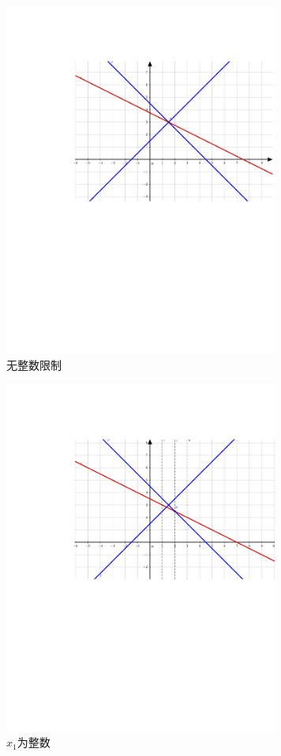 \documentclass[UTF8]{ctexart}
\begin{document}
\begin{enumerate}
\begin{figure}[H]
\small
\centering
\includegraphics[width=9cm]{1.pdf}
\caption{无整数限制}
\end{figure}

\begin{figure}[H]
\small
\centering
\includegraphics[width=9cm]{2.pdf}
\caption{$x_1$为整数}
\end{figure}


\end{enumerate}
\end{document}

